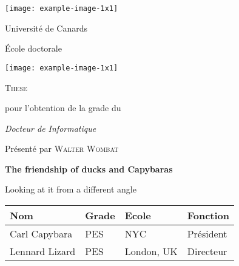 \documentclass{article}
\begin{document}
\begin{titlepage}
	\begin{center}
	\texttt{[image: example-image-1x1]}
	\hfill
	\parbox{.5\linewidth}{%
		\centering
		Universit\'e de Canards\par
		\vspace{.05\textheight}
		\'Ecole doctorale\par
	}
	\hfill
	\texttt{[image: example-image-1x1]}
	\par
		\vspace{.05\textheight}
		{\LARGE\scshape These\par}
		\vspace{.05\textheight}
		pour l'obtention de la grade du \par
		{\itshape\large Docteur de Informatique\par}
		\vspace{.05\textheight}
		Pr\'esent\'e par \textsc{Walter Wombat}\par
		\vspace{.05\textheight}
		{\Huge\bfseries The friendship of ducks and
		Capybaras\par}
		\vspace{.05\textheight}
		{\large Looking at it from a different angle\par}
		\vfill
		\noindent\begin{tabularx}{\textwidth}{XXXX}
			\toprule
			Nom & Grade & Ecole & Fonction \\
			\midrule
			Carl Capybara & PES & NYC & Pr\'esident \\
 Lennard Lizard & PES & London, UK & Directeur \\
 \bottomrule
 \end{tabularx}
\end{center}
\end{titlepage}
\end{document}
